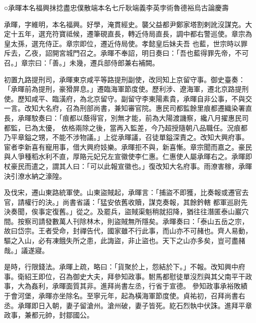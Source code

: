 
\begin{pinyinscope}

 ○承暉本名福興抹捻盡忠僕散端本名七斤耿端義李英孛術魯德裕烏古論慶壽



 承暉，字維明，本名福興。好學，淹貫經史。襲父益都尹鄭家塔割剌訛沒謀克。大定十五年，選充符寶祗候，遷筆硯直長，轉近侍局直長，調中都右警巡使。章宗為皇太孫，選充侍正。章宗即位，遷近侍局使。孝懿皇后妹夫吾
 也藍，世宗時以罪斥去，乙夜，詔開宮城門召之。承暉不奉詔，明日奏曰：「吾也藍得罪先帝，不可召。」章宗曰：「善。」未幾，遷兵部侍郎兼右補闕。



 初置九路提刑司，承暉東京咸平等路提刑副使，改同知上京留守事。御史臺奏：「承暉前為提刑，豪猾屏息。」遷臨海軍節度使。歷利涉、遼海軍，遷北京路提刑使。歷知咸平、臨潢府，為北京留守。副留守李東陽素貴，承暉自非公事，不與交一言。改知大名府，召為刑部尚書，兼知審官院。惠民司都監餘里痕都遷織染署直長，承暉駮奏曰：「痕都以蔭得官，別無才能，前為大陽渡譏察，纔八月擢惠民司都監，已為太優，
 依格兩除之後，當再入監差，今乃超授隨朝八品職任。況痕都乃平章鎰之甥，不能不涉物議。」上從承暉議，召徒單鎰深責之。改知大興府事。宦者李新喜有寵用事，借大興府妓樂。承暉拒不與，新喜慚。章宗聞而嘉之。豪民與人爭種稻水利不直，厚賂元妃兄左宣徽使李仁惠。仁惠使人屬承暉右之。承暉即杖豪民而遣之，謂其人曰：「可以此報宣徽也。」復改知大名府事。雨潦害稼，承暉決引潦水納之濠隍。



 及伐宋，遷山東路統軍使。山東盜賊起，承暉言：「捕盜不即獲，比奏報或遷官去官，請權行的決。」尚書省議：「猛安依舊收贖，謀克奏報，其餘鈐轄
 都軍巡尉先決奏聞，俟事定復舊。」從之。及罷兵，盜賊渠魁稍就招降，猶往往潛匿泰山巖穴間。按察司請發數萬人刊除林木，則盜賊無所隱矣。承暉奏曰：「泰山五岳之宗，故曰岱宗。王者受命，封禪告代，國家雖不行此事，而山亦不可赭也。齊人易動，驅之入山，必有凍餓失所之患，此誨盜，非止盜也。天下之山亦多矣，豈可盡赭哉。」議遂寢。



 是時，行限錢法。承暉上疏，略曰：「貨聚於上，怨結於下。」不報。改知興中府事。衛紹王即位，召為御史大夫，拜參知政事。駙馬都慰徒單沒烈與其父南平干政事，大為姦利，承暉面質其非。進拜尚書左丞，行省于宣德。
 參知政事承裕敗績于會河堡，承暉亦坐除名。至寧元年，起為橫海軍節度使。貞祐初，召拜尚書右丞。承暉即日入朝，妻子留滄州。滄州破，妻子皆死。紇石烈執中伏誅。進拜平章政事，兼都元帥，封鄒國公。




\end{pinyinscope}
